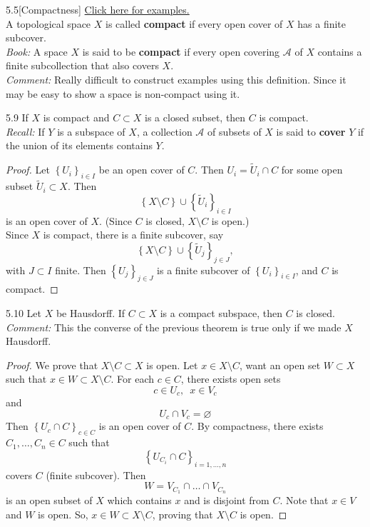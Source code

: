 \begin{customdefinition}{5.5}[Compactness] \hypertarget{Definition_5.5}{\hyperlink{ex.d.5.5}{Click here for examples.}}\\
A topological space $X$ is called {\bf compact} if every open cover of $X$ has a finite subcover.\\
\emph{Book:} A space $X$ is said to be {\bf compact} if every open covering $\mathcal{A}$ of $X$ contains a finite subcollection that also covers $X$.\\
\emph{Comment:} Really difficult to construct examples using this definition. Since it may be easy to show a space is non-compact using it.
\end{customdefinition}

\begin{customthm}{5.9}
If $X$ is compact and $C \subset X$ is a closed subset, then $C$ is compact.\\
\emph{Recall:} If $Y$ is a subspace of $X$, a collection $\mathcal{A}$ of subsets of $X$ is said to {\bf cover} $Y$ if the union of its elements contains $Y$.
\end{customthm}

\begin{proof}
Let $\left\{U_i\right\}_{i \in I}$ be an open cover of $C$. Then $U_i = \widetilde{U}_i \cap C$ for some open subset $\widetilde{U}_i \subset X$. Then 
$$\left\{X \setminus C\right\} \cup \left\{\widetilde{U}_i\right\}_{i \in I}$$
is an open cover of $X$. (Since $C$ is closed, $X \setminus C$ is open.) \\
Since $X$ is compact, there is a finite subcover, say 
$$\left\{X \setminus C\right\} \cup \left\{\widetilde{U}_j\right\}_{j \in J},$$
with $J\subset I$ finite. Then $\left\{U_j\right\}_{j \in J}$ is a finite subcover of $\left\{U_i\right\}_{i \in I}$, and $C$ is compact.
\end{proof}

\begin{customthm}{5.10}
Let $X$ be Hausdorff. If $C \subset X$ is a compact subspace, then $C$ is closed.\\
\emph{Comment:} This the converse of the previous theorem is true only if we made $X$ Hausdorff.
\end{customthm}

\begin{proof}
We prove that $X \setminus C \subset X$ is open. Let $x \in X \setminus C$, want an open set $W \subset X$ such that $x \in W \subset X \setminus C$. For each $c \in C$, there exists open sets 
$$c \in U_c, \,\,\, x \in V_c$$
and 
$$U_c \cap V_c = \varnothing$$
Then $\left\{U_c \cap C\right\}_{c \in C}$ is an open cover of $C$. By compactness, there exists $C_1, \dots, C_n \in C$ such that 
$$\left\{U_{C_i} \cap C\right\}_{i = 1, \dots, n}$$
covers $C$ (finite subcover). Then 
$$W = V_{C_1} \cap \dots \cap V_{C_n}$$
is an open subset of $X$ which contains $x$ and is disjoint from $C$. Note that $x \in V$ and $W$ is open. So, $x \in W \subset X \setminus C$, proving that $X \setminus C$ is open.
\end{proof}

